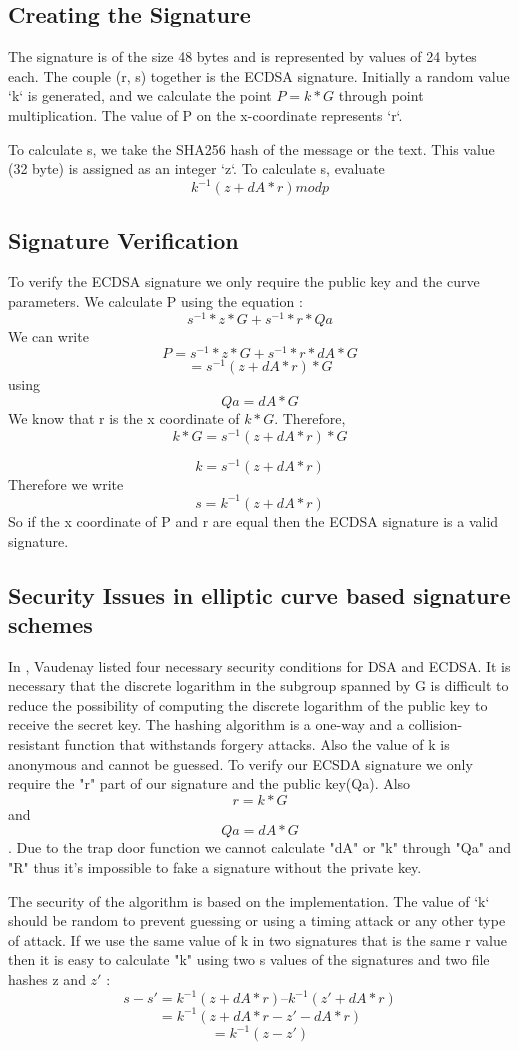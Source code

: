 \documentclass{article}
\begin{document}
\subsection{Creating the Signature}
 The signature is of the size 48 bytes and is represented by values of 24 bytes each. The couple (r, s) together is the ECDSA signature.
Initially a random value ‘k‘ is generated, and we calculate the point $P=k*G$ through point multiplication. The value of P on the x-coordinate represents ‘r‘. 

$$$$
 To calculate s, we take the SHA256 hash of the message or the text. This value (32 byte) is assigned as an integer ‘z‘. To calculate s, evaluate
  $$k^{-1} (z + dA* r) mod p$$
\subsection{Signature Verification}
To verify the ECDSA signature we only require the public key and the curve parameters. We calculate P using the equation :
$$ s^{-1}*z*G + s^{-1} *r* Qa$$
We can write
$$P = s^{-1}*z*G + s^{-1}* r * dA*G$$ 
    $$ = s^{-1} (z + dA* r) * G$$ using $$Qa = dA*G$$
We know that r is the x coordinate of $k * G$. Therefore,
$$k*G = s^{-1} (z + dA * r) *G$$

$$k = s^{-1} (z + dA * r)$$
Therefore we write
$$s = k^{-1} (z + dA *r)$$
So if the x coordinate of P and r are equal then the ECDSA signature is a valid signature.

\subsection{Security Issues in elliptic curve based signature schemes}
In \cite{}, Vaudenay listed four necessary security
conditions for DSA and ECDSA. It is necessary that the 
discrete logarithm in the subgroup spanned by G 
is difficult to reduce the possibility of computing the discrete
logarithm of the public key to receive the secret key. 
The hashing algorithm is a one-way and
a collision-resistant function that withstands forgery attacks.
Also the value of k is anonymous and cannot be guessed.
To verify our ECSDA signature we only require the "r" part of our signature and the public key(Qa). Also $$r=k*G$$ and $$Qa = dA*G$$. Due to the trap door function we cannot calculate "dA" or "k" through "Qa" and "R" thus it's impossible to fake a signature without the private key.

The security of the algorithm is based on the implementation. The value of ‘k‘ should be random to prevent guessing or using a timing attack or any other type of attack.
If we use the same value of k in two signatures that is the same r value then it is easy to calculate "k" using two s values of the signatures and two file hashes z and $z'$ :
 $$s- s' = k^{-1} (z + dA*r) – k^{-1} (z' + dA*r) $$
          $$= k^{-1} (z + dA*r - z'- dA*r)$$
          $$= k^{-1} (z - z')$$
\end{document}
